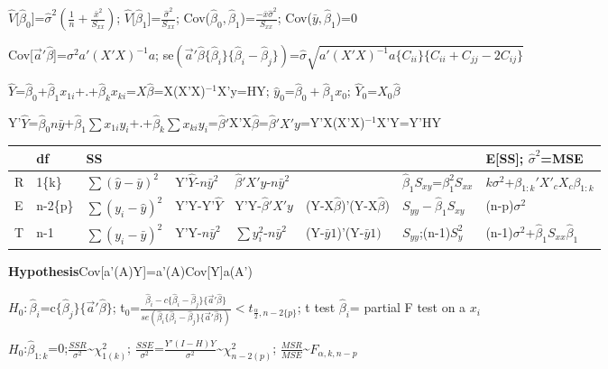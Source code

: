 \documentclass[
  10pt,
  twocolumn]{article}
\begin{document}
\(\hat V[\hat\beta_0\){]}=\(\hat\sigma^2(\frac1n+\frac{\bar x^2}{S_{xx}})\);
\(\hat V[\hat\beta_1\){]}=\(\frac{\hat\sigma^2}{S_{xx}}\);
Cov(\(\hat\beta_0,\hat\beta_1\))=\(\frac{-\bar x\hat\sigma^2}{S_{xx}}\);
Cov(\(\bar y,\hat\beta_1\))=0

Cov{[}\(\vec a'\hat\beta\){]}=\(\sigma^2a'(X'X)^{-1}a\);
se\((\vec a'\hat\beta\{\hat\beta_i\}\{\hat\beta_i-\hat\beta_j\})\)=\(\hat\sigma\sqrt{a'(X'X)^{-1}a\{C_{ii}\}\{C_{ii}+C_{jj}-2C_{ij}\}}\)

\dotfill

\(\hat Y\)=\(\hat\beta_0\)+\(\hat\beta_1x_{1i}\)+.+\(\hat\beta_kx_{ki}\)=\(X\hat\beta\)=X(X'X)\(^{-1}\)X'y=HY;
\(\hat y_0\)=\(\hat\beta_0+\hat\beta_1x_0\);
\(\hat Y_0\)=\(X_0\hat\beta\)

Y'\(\hat Y\)=\(\hat\beta_0n\bar y\)+\(\hat\beta_1\sum x_{1i}y_i\)+.+\(\hat\beta_k\sum x_{ki}y_i\)=\(\hat\beta'\)X'X\(\hat\beta\)=\(\hat\beta' X'y\)=Y'X(X'X)\(^{-1}\)X'Y=Y'HY

\begin{tabular}{l|l|l|l|l|l|l|l}
  & df & SS & & & & & E[SS]; $\hat\sigma^2$=MSE\\\hline
R & 1\{k\}  &$\sum(\hat y-\bar y)^2$& Y'$\hat Y$-$n\bar y^2$& $\hat\beta'X'y$-$n\bar y^2$& & $\hat\beta_1S_{xy}$=$\beta_1^2S_{xx}$&$k\sigma^2$+$\beta_{1:k}'X'_{c}X_{c}\beta_{1:k}$\\
E & n-2\{p\}&$\sum(y_i-\hat y)^2$   & Y'Y-Y'$\hat Y$ & Y'Y-$\hat\beta' X'y$       &(Y-X$\hat\beta$)'(Y-X$\hat\beta$) &$S_{yy}-\hat\beta_1S_{xy}$& (n-p)$\sigma^2$\\
T & n-1     &$\sum(y_i-\bar y)^2$   &Y'Y-$n\bar y^2$& $\sum y_i^2$-$n\bar y^2$   &(Y-$\bar y1$)'(Y-$\bar y1)$       &$S_{yy}$;(n-1)$S_y^2$& (n-1)$\sigma^2$+$\hat\beta_1S_{xx}\hat\beta_1$\\\hline
\end{tabular}

\textbf{Hypothesis}Cov{[}a'(A)Y{]}=a'(A)Cov{[}Y{]}a(A')\dotfill

\(H_0: \hat\beta_i\)=c\(\{\hat\beta_j\}\{\vec a'\hat\beta\}\);
t\(_0\)=\(\frac{\hat\beta_i-c\{\hat\beta_i-\hat\beta_j\}\{\vec a'\hat\beta\}}{se(\hat\beta_i\{\hat\beta_i-\hat\beta_j\}\{\vec a'\hat\beta\})}<t_{\frac{\alpha}{2},n-2\{p\}}\);
t test \(\hat\beta_i\)= partial F test on a \(x_i\)

\(H_0\):\(\hat\beta_{1:k}\)=0;\(\frac{SSR}{\sigma^2}\)\textasciitilde{}\(\chi^2_{1(k)}\);
\(\frac{SSE}{\sigma^2}\)=\(\frac{Y'(I-H)Y}{\sigma^2}\)\textasciitilde{}\(\chi^2_{n-2(p)}\);
\(\frac{MSR}{MSE}\)\textasciitilde{}\(F_{\alpha,k,n-p}\)
\end{document}
